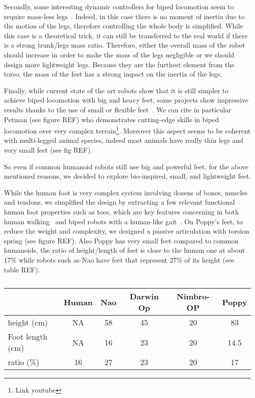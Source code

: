 Secondly, some interesting dynamic controllers for biped locomotion seem to require mass-less legs~\parencite{hyon2002development}. Indeed, in this case there is no moment of inertia due to the motion of the legs, therefore controlling the whole body is simplified. While this case is a theoretical trick, it can still be transferred to the real world if there is a strong trunk/legs mass ratio. Therefore, either the overall mass of the robot should increase in order to make the mass of the legs negligible or we should design more lightweight legs.
Because they are the furthest element from the torso, the mass of the feet has a strong impact on the inertia of the legs.

Finally, while current state of the art robots show that it is still simpler to achieve biped locomotion with big and heavy feet, some projects show impressive results thanks to the use of small or flexible feet~\parencite{bruneau2001dynamic}. We can cite in particular Petman (see figure REF) who demonstrates cutting-edge skills in biped locomotion over very complex terrain\footnote{Link youtube}.
Moreover this aspect seems to be coherent with multi-legged animal species, indeed most animals have really thin legs and very small feet (see fig REF).

So even if common humanoid robots still use big and powerful feet, for the above mentioned reasons, we decided to explore bio-inspired, small, and lightweight feet.

While the human foot is very complex system involving dozens of bones, muscles and tendons, we simplified the design by extracting a few relevant functional human foot properties such as toes, which are key features concerning in both human walking~\cite{Hughes1990} and biped robots with a human-like gait~\cite{Sellaouti2006}. On Poppy's feet, to reduce the weight and complexity, we designed a passive articulation with torsion spring (see figure REF).
Also Poppy has very small feet compared to common humanoids, the ratio of height/length of feet is close to the human one at about 17\% while robots such as Nao have feet that represent 27\% of its height (see table REF).

\begin{table}[ht]
\centering
\begin{tabular}{l| c c c c c}
    & Human & Nao & Darwin Op & Nimbro-OP & Poppy \\
    \hline
    height (cm) & NA & 58 & 45 & 20 & 83\\
    Foot length (cm) & NA & 16 & 23 & 20 & 14.5\\
    ratio (\%) & 16 & 27 & 23 & 20 & 17\\
\end{tabular}
\caption{}
\label{tab:poppy_feet_compare}
\end{table}

